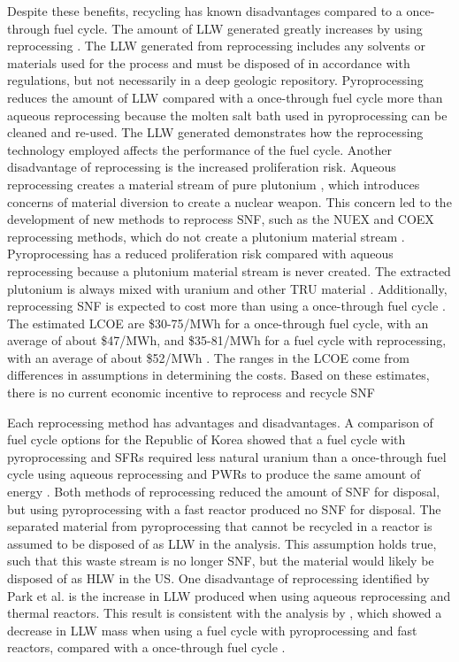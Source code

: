 Despite these benefits, recycling has known disadvantages compared to 
a once-through fuel cycle.
The amount of \gls{LLW} generated greatly increases by using 
reprocessing \cite{widder_benefits_2010}. The \gls{LLW} generated 
from reprocessing includes any solvents or materials used for the process 
and must be disposed of in accordance with regulations, but not 
necessarily in a deep geologic repository.
Pyroprocessing reduces the amount of \gls{LLW} compared with 
a once-through fuel cycle more than aqueous reprocessing because
the molten salt bath used in pyroprocessing can be cleaned 
and re-used. The \gls{LLW} generated demonstrates how the reprocessing 
technology employed affects the performance of the fuel cycle. 
Another disadvantage of reprocessing is the increased proliferation 
risk. Aqueous reprocessing creates a material stream of 
pure plutonium \cite{widder_benefits_2010}, which introduces 
concerns of material diversion to 
create a nuclear weapon. This concern led to the development of new 
methods to reprocess \gls{SNF}, such as the NUEX and COEX reprocessing 
methods, which do not create a plutonium material stream 
\cite{widder_benefits_2010}. 
Pyroprocessing has a reduced proliferation risk compared with 
aqueous reprocessing
because a plutonium material stream is never created. The extracted 
plutonium is always mixed with uranium and other \gls{TRU} material 
\cite{noauthor_status_2021}.
Additionally, reprocessing \gls{SNF} is expected to cost more than 
using a once-through fuel cycle \cite{rodriguez-penalonga_review_2017,widder_benefits_2010}. 
The estimated 
\gls{LCOE} are \$30-75/MWh for a once-through fuel cycle, with an 
average of about \$47/MWh, and \$35-81/MWh for a fuel 
cycle with reprocessing, with an average of about \$52/MWh 
\cite{widder_benefits_2010}. The ranges in the \gls{LCOE} come from 
differences in assumptions in determining the costs. Based on these 
estimates, there is no current economic incentive to reprocess and recycle 
\gls{SNF}

Each reprocessing method has advantages and disadvantages. 
A comparison of fuel cycle options for the Republic of Korea 
showed that a fuel cycle with pyroprocessing and \glspl{SFR} required less natural 
uranium than a once-through fuel cycle using aqueous reprocessing 
and \glspl{PWR} to produce the same amount of energy 
\cite{park_comparative_2011}. Both methods of reprocessing  
reduced the amount of \gls{SNF} for disposal,
but using pyroprocessing with a fast reactor produced no \gls{SNF} for 
disposal. The separated material from 
pyroprocessing that cannot be recycled in a reactor is assumed to be 
disposed of as \gls{LLW} in the analysis. This assumption 
holds true, such that this waste stream is no longer 
\gls{SNF}, but the material would likely be disposed of 
as \gls{HLW} in the US.
One disadvantage of reprocessing 
identified by Park et al. \cite{park_comparative_2011} is the 
increase in \gls{LLW} produced 
when using aqueous reprocessing and 
thermal reactors. This result is consistent with the analysis 
by \cite{widder_benefits_2010}, which showed a decrease in \gls{LLW} 
mass when using a fuel cycle with pyroprocessing and fast reactors, 
compared with a once-through fuel cycle \cite{park_comparative_2011}. 


